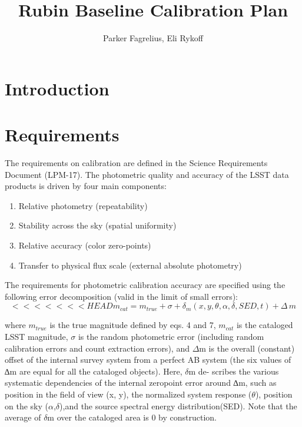 \documentclass[SE,authoryear,toc]{article}
\title{Rubin Baseline Calibration Plan}
\author{%
Parker Fagrelius, Eli Rykoff
}
\date{\vcsDate}
\begin{document}
\maketitle


\appendix

\section{Introduction}

\section{Requirements}
The requirements on calibration are defined in the Science Requirements Document (LPM-17). The photometric quality and accuracy of the LSST data products is driven by four main components:
\begin{enumerate}
    \item Relative photometry (repeatability)
    \item Stability across the sky (spatial uniformity)
    \item Relative accuracy (color zero-points)
    \item Transfer to physical flux scale (external absolute photometry)
\end{enumerate}

The requirements for photometric calibration accuracy are specified using the following error decomposition (valid in the limit of small errors):
\begin{equation}
<<<<<<< HEAD
    m_{cat} = m_{true} +\sigma+\delta_{m} (x,y,\theta,\alpha,\delta,SED,t)+\Delta\,m
\end{equation}

where $m_{true}$ is the true magnitude defined by eqs. 4 and 7, $m_{cat}$ is the cataloged LSST magnitude, $\sigma$ is the random photometric error (including random calibration errors and count extraction errors), and $\Delta$m is the overall (constant) offset of the internal survey system from a perfect AB system (the six values of ∆m are equal for all the cataloged objects). 
Here, $\delta$m de- scribes the various systematic dependencies of the internal zeropoint error around ∆m, such as position in the field of view (x, y), the normalized system response ($\theta$), position on the sky ($\alpha$,$\delta$),and the source spectral energy distribution(SED).
Note that the average of $\delta$m over the cataloged area is 0 by construction.
\end{document}
